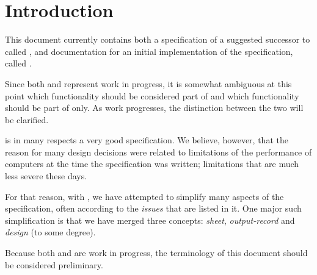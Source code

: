 \chapter{Introduction}

This document currently contains both a specification of a suggested
successor to \climtwo{} called \clim{}, and documentation for an
initial implementation of the \clim{} specification, called
\sysname{}.  

Since both \clim{} and \sysname{} represent work in progress, it is
somewhat ambiguous at this point which functionality should be
considered part of \clim{} and which functionality should be part of
\sysname{} only.  As work progresses, the distinction between the two
will be clarified. 

\climtwo{} is in many respects a very good specification.  We believe,
however, that the reason for many design decisions were related to
limitations of the performance of computers at the time the
specification was written; limitations that are much less severe these
days.

For that reason, with \clim{}, we have attempted to simplify many
aspects of the \climtwo{} specification, often according to the
\emph{issues} that are listed in it.  One major such simplification is
that we have merged three concepts: \emph{sheet}, \emph{output-record}
and \emph{design} (to some degree).

Because both \clim{} and \sysname{} are work in progress, the
terminology of this document should be considered preliminary.  



